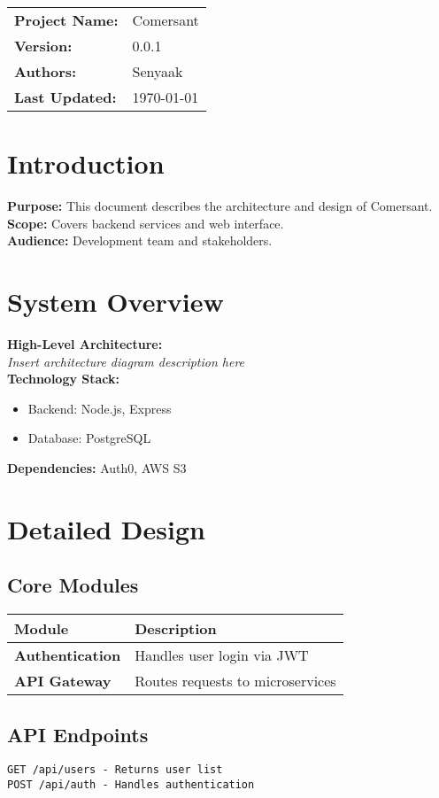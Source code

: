 \documentclass{article}
\begin{document}
\noindent
\begin{tabularx}{\textwidth}{@{} l X @{}}
\textbf{Project Name:} & Comersant \\
\textbf{Version:} & 0.0.1 \\
\textbf{Authors:} & Senyaak \\
\textbf{Last Updated:} & \today \\
\end{tabularx}

\vspace{2em}

\section*{Introduction}
\textbf{Purpose:} This document describes the architecture and design of Comersant. \\
\textbf{Scope:} Covers backend services and web interface. \\
\textbf{Audience:} Development team and stakeholders.

\section*{System Overview}
\textbf{High-Level Architecture:} \\
\textit{Insert architecture diagram description here} \\  %
\textbf{Technology Stack:} 
\begin{itemize}
    \item Backend: Node.js, Express
    \item Database: PostgreSQL
\end{itemize}
\textbf{Dependencies:} Auth0, AWS S3

\section*{Detailed Design}
\subsection*{Core Modules}
\begin{tabularx}{\textwidth}{@{} >{\bfseries}l | X @{}}  %
\hline
Module & Description \\ 
\hline
Authentication & Handles user login via JWT \\ 
\hline
API Gateway & Routes requests to microservices \\
\hline
\end{tabularx}

\subsection*{API Endpoints}
\begin{verbatim}
GET /api/users - Returns user list
POST /api/auth - Handles authentication
\end{verbatim}
\end{document}
